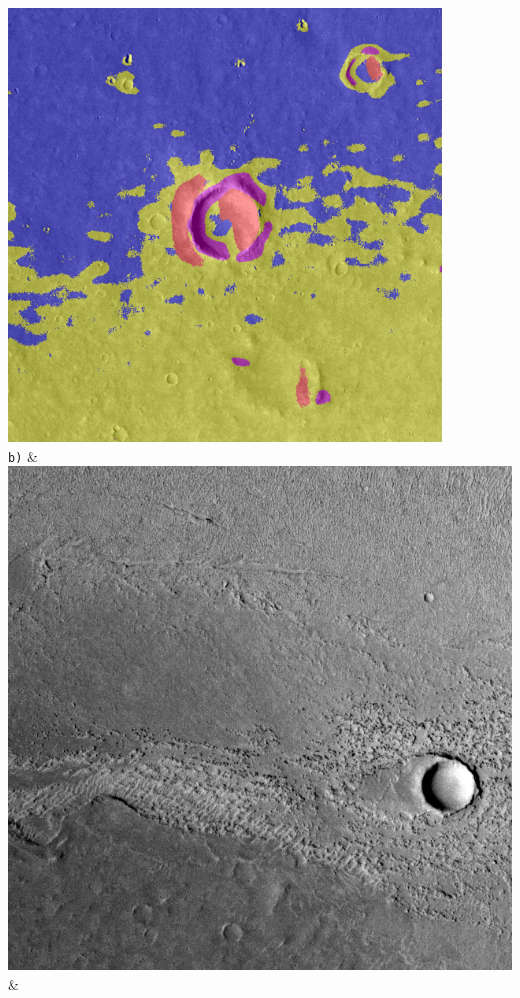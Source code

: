 \begin{table}[h!]
\begin{tabularx}{\textwidth}
		\includegraphics[width=0.9\linewidth]{images/gen/filter_size/p03_01.png_1.50.png} \\
		\texttt{b)} &
		\includegraphics[width=0.9\linewidth]{images/p03/p03_02.png} &

\end{tabularx}
\end{table}
